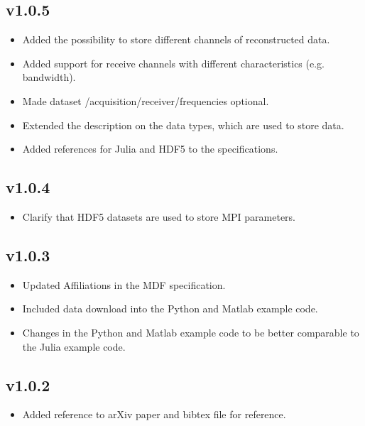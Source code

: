 \documentclass[landscape,a4paper]{article} %
\newcommand{\inlvar}[1]{{\ttfamily#1}}
\begin{document}
\begin{multicols}{2}
\subsection{v1.0.5}

\begin{itemize}
	\item Added the possibility to store different channels of reconstructed data.
	\item Added support for receive channels with different characteristics (e.g. bandwidth).
	\item Made dataset \inlvar{/acquisition/receiver/frequencies} optional.
	\item Extended the description on the data types, which are used to store data.
	\item Added references for Julia and HDF5 to the specifications.
\end{itemize}


\subsection{v1.0.4}

\begin{itemize}
	\item Clarify that HDF5 datasets are used to store MPI parameters.
\end{itemize}


\subsection{v1.0.3}

\begin{itemize}
	\item Updated Affiliations in the MDF specification.
	\item Included data download into the Python and Matlab example code.
	\item Changes in the Python and Matlab example code to be better comparable to the Julia example code.
\end{itemize}


\subsection{v1.0.2}

\begin{itemize}
	\item Added reference to arXiv paper and bibtex file for reference.
\end{itemize}



\end{multicols}
\end{document}
